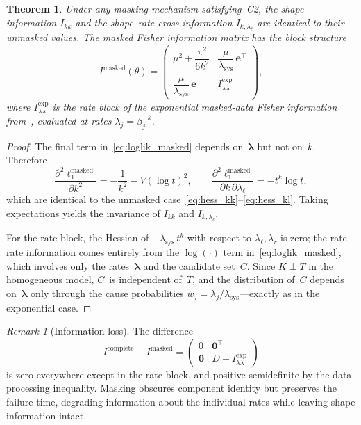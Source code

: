 \documentclass[12pt]{article}
\newtheorem{theorem}{Theorem}
\theoremstyle{remark}
\newtheorem{remark}{Remark}
\newcommand{\lsys}{\lambda_{\mathrm{sys}}}
\newcommand{\ee}{\mathbf{e}}
\begin{document}
\begin{theorem}\label{thm:masking}
Under any masking mechanism satisfying~C2, the shape information
$I_{kk}$ and the shape--rate cross-information $I_{k,\lambda_\ell}$ are
identical to their unmasked values.  The masked Fisher information matrix
has the block structure
%
\begin{equation}\label{eq:fim_masked}
I^{\mathrm{masked}}(\theta)
= \begin{pmatrix}
  \mu^2 + \dfrac{\pi^2}{6k^2}
    & \dfrac{\mu}{\lsys}\,\ee^\top \\[10pt]
  \dfrac{\mu}{\lsys}\,\ee
    & I^{\mathrm{exp}}_{\lambda\lambda}
  \end{pmatrix},
\end{equation}
%
where $I^{\mathrm{exp}}_{\lambda\lambda}$ is the rate block of the
exponential masked-data Fisher information
from~\citet{towell2026exponential}, evaluated at rates
$\lambda_j = \beta_j^{-k}$.
\end{theorem}

\begin{proof}
The final term in~\eqref{eq:loglik_masked} depends on~$\bm{\lambda}$
but not on~$k$.  Therefore
\[
\frac{\partial^2 \ell_1^{\mathrm{masked}}}{\partial k^2}
= -\frac{1}{k^2} - V(\log t)^2,
\qquad
\frac{\partial^2 \ell_1^{\mathrm{masked}}}{\partial k\,\partial
  \lambda_\ell}
= -t^k \log t,
\]
which are identical to the unmasked
case~\eqref{eq:hess_kk}--\eqref{eq:hess_kl}.  Taking expectations
yields the invariance of $I_{kk}$ and $I_{k,\lambda_\ell}$.

For the rate block, the Hessian of
$-\lsys\,t^k$ with respect to $\lambda_\ell,\lambda_r$ is zero;
the rate--rate information comes entirely from the
$\log(\cdot)$ term in~\eqref{eq:loglik_masked}, which involves
only the rates~$\bm{\lambda}$ and the candidate set~$C$.  Since
$K \perp T$ in the homogeneous model, $C$~is independent of~$T$, and
the distribution of~$C$ depends on~$\bm{\lambda}$ only through the
cause probabilities $w_j = \lambda_j/\lsys$---exactly as in the
exponential case.
\end{proof}

\begin{remark}[Information loss]\label{rem:info_loss}
The difference
\[
I^{\mathrm{complete}} - I^{\mathrm{masked}}
= \begin{pmatrix}
  0 & \bm{0}^\top \\
  \bm{0} & D - I^{\mathrm{exp}}_{\lambda\lambda}
  \end{pmatrix}
\]
is zero everywhere except in the rate block, and positive semidefinite by
the data processing inequality.  Masking obscures component identity but
preserves the failure time, degrading information about the individual
rates while leaving shape information intact.
\end{remark}
\end{document}
